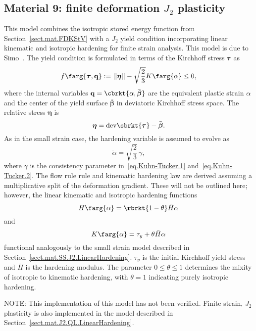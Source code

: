 \subsection{Material 9: finite deformation $J_{2}$ plasticity}
\label{sect.mat.FD.J2.LinearHardening}
This model combines the isotropic stored energy function from 
Section~\ref{sect.mat.FDKStV} with
a $J_{2}$ yield condition incorporating
linear kinematic and isotropic hardening for finite strain analysis. 
This model is due to Simo~\cite{Simo1988a,Simo1988b}.
The yield condition is formulated in terms of the
Kirchhoff stress $\boldsymbol{\tau}$ as
\begin{equation}
	f\farg{\boldsymbol{\tau}, \mathbf{q}} := 
	||\boldsymbol{\eta}|| 
	- \sqrt{\frac{2}{3}} K\farg{\alpha} \le 0,
\end{equation}
where the internal variables 
$\mathbf{q} = \cbrkt{\alpha, \bar{\boldsymbol{\beta}}}$ are
the equivalent plastic strain $\alpha$ and the center of
the yield surface $\bar{\boldsymbol{\beta}}$ in deviatoric
Kirchhoff stress space. The relative stress $\boldsymbol{\eta}$ is
\begin{equation}
\boldsymbol{\eta} = \textrm{dev}\sbrkt{\boldsymbol\tau} - 
\bar{\boldsymbol{\beta}}.
\end{equation}
As in the small strain case, the hardening variable is assumed
to evolve as
\begin{equation}
\dot{\alpha} = \sqrt{\frac{2}{3}}\,\gamma,	
\end{equation}
where $\gamma$ is the consistency parameter 
in~\eqref{eq.Kuhn-Tucker.1} and~\eqref{eq.Kuhn-Tucker.2}.
The flow rule rule and kinematic hardening law are derived
assuming a multiplicative split of the deformation gradient.
These will not be outlined here; however,
the linear kinematic and isotropic hardening functions
\begin{equation}
	H\farg{\alpha} = \rbrkt{1 - \theta} \bar{H} \alpha
\end{equation}
and
\begin{equation}
	K\farg{\alpha} = \tau_{y} + \theta \bar{H} \alpha
\end{equation}
functional analogously to the small strain model described
in Section~\ref{sect.mat.SS.J2.LinearHardening}.
$\tau_{y}$ is the initial Kirchhoff yield stress and
$\bar{H}$ is the hardening modulus.
The parameter $0 \le \theta \le 1$ determines the mixity of 
isotropic to kinematic hardening, with $\theta = 1$ indicating purely 
isotropic hardening.

NOTE: This implementation of this model has not been verified.
Finite strain, $J_{2}$ plasticity is also implemented in the model
described in Section~\ref{sect.mat.J2.QL.LinearHardening}.

